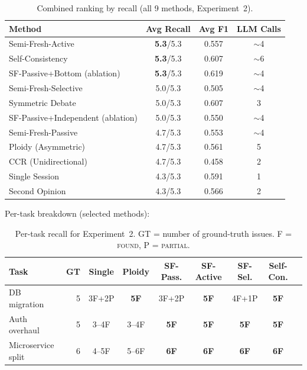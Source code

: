 \documentclass[11pt]{article}
\begin{document}
\begin{table}[t]
\centering
\caption{Combined ranking by recall (all 9 methods, Experiment~2).}
\label{tab:exp2-combined}
\small
\begin{tabular}{@{}lccc@{}}
\toprule
\textbf{Method} & \textbf{Avg Recall} & \textbf{Avg F1} & \textbf{LLM Calls} \\
\midrule
Semi-Fresh-Active         & \textbf{5.3}/5.3 & 0.557 & $\sim$4 \\
Self-Consistency          & \textbf{5.3}/5.3 & 0.607 & $\sim$6 \\
SF-Passive+Bottom (ablation) & \textbf{5.3}/5.3 & 0.619 & $\sim$4 \\
Semi-Fresh-Selective      & 5.0/5.3          & 0.505 & $\sim$4 \\
Symmetric Debate          & 5.0/5.3          & 0.607 & 3       \\
SF-Passive+Independent (ablation) & 5.0/5.3  & 0.550 & $\sim$4 \\
Semi-Fresh-Passive        & 4.7/5.3          & 0.553 & $\sim$4 \\
Ploidy (Asymmetric)       & 4.7/5.3          & 0.561 & 5       \\
CCR (Unidirectional)      & 4.7/5.3          & 0.458 & 2       \\
Single Session            & 4.3/5.3          & 0.591 & 1       \\
Second Opinion            & 4.3/5.3          & 0.566 & 2       \\
\bottomrule
\end{tabular}
\end{table}

Per-task breakdown (selected methods):

\begin{table}[t]
\centering
\caption{Per-task recall for Experiment~2. GT = number of ground-truth issues. F = \textsc{found}, P = \textsc{partial}.}
\label{tab:exp2-pertask}
\small
\begin{tabular}{@{}lr ccccccc@{}}
\toprule
\textbf{Task} & \textbf{GT} & \textbf{Single} & \textbf{Ploidy} & \textbf{SF-Pass.} & \textbf{SF-Active} & \textbf{SF-Sel.} & \textbf{Self-Con.} \\
\midrule
DB migration       & 5 & 3F+2P          & \textbf{5F} & 3F+2P          & \textbf{5F} & 4F+1P          & \textbf{5F} \\
Auth overhaul      & 5 & 3--4F          & 3--4F       & \textbf{5F}    & \textbf{5F} & \textbf{5F}    & \textbf{5F} \\
Microservice split & 6 & 4--5F          & 5--6F       & \textbf{6F}    & \textbf{6F} & \textbf{6F}    & \textbf{6F} \\
\bottomrule
\end{tabular}
\end{table}
\end{document}
